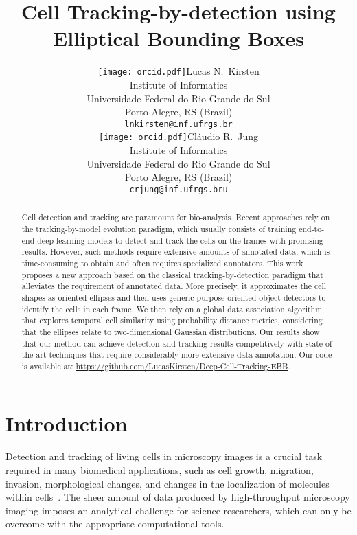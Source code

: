 \documentclass{article}
\title{Cell Tracking-by-detection using Elliptical Bounding Boxes}
\author{ \href{https://orcid.org/0000-0001-6611-5327}{\texttt{[image: orcid.pdf]}\hspace{1mm}Lucas N.~Kirsten}\\
	Institute of Informatics\\
	Universidade Federal do Rio Grande do Sul\\
	Porto Alegre, RS (Brazil) \\
	\texttt{lnkirsten@inf.ufrgs.br} \\
\And
	\href{https://orcid.org/0000-0002-4711-5783}{\texttt{[image: orcid.pdf]}\hspace{1mm}Cláudio R.~Jung} \\
	Institute of Informatics\\
	Universidade Federal do Rio Grande do Sul\\
	Porto Alegre, RS (Brazil) \\
	\texttt{crjung@inf.ufrgs.bru} \\
}
\begin{document}
\maketitle

\begin{abstract}
Cell detection and tracking are paramount for bio-analysis. Recent approaches rely on the tracking-by-model evolution paradigm, which usually consists of training end-to-end deep learning models to detect and track the cells on the frames with promising results. However, such methods require extensive amounts of annotated data, which is time-consuming to obtain and often requires specialized annotators. This work proposes a new approach based on the classical tracking-by-detection paradigm that alleviates the requirement of annotated data. More precisely, it approximates the cell shapes as oriented ellipses and then uses generic-purpose oriented object detectors to identify the cells in each frame. We then rely on a global data association algorithm that explores temporal cell similarity using probability distance metrics, considering that the ellipses relate to two-dimensional Gaussian distributions. Our results show that our method can achieve detection and tracking results competitively with state-of-the-art techniques that require considerably more extensive data annotation. Our code is available at: \url{https://github.com/LucasKirsten/Deep-Cell-Tracking-EBB}.
\end{abstract}


\maketitle

\section{Introduction}
Detection and tracking of living cells in microscopy images is a crucial task required in many biomedical applications, such as cell growth, migration, invasion, morphological changes, and changes in the localization of molecules within cells~\cite{syed2008detection,leite2015computational,di2019learning,gradeci2020single}. The sheer amount of data produced by high-throughput microscopy imaging imposes an analytical challenge for science researchers, which can only be overcome with the appropriate computational tools. 
\end{document}
